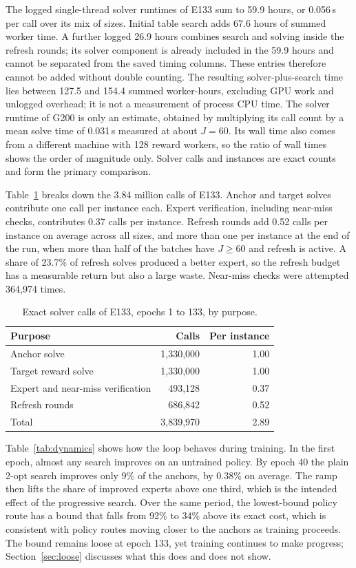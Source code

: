 \documentclass[preprint,12pt,authoryear]{elsarticle}
\begin{document}
The logged single-thread solver runtimes of E133 sum to 59.9 hours, or 0.056\,s per call over its mix of sizes. Initial table search adds 67.6 hours of summed worker time. A further logged 26.9 hours combines search and solving inside the refresh rounds; its solver component is already included in the 59.9 hours and cannot be separated from the saved timing columns. These entries therefore cannot be added without double counting. The resulting solver-plus-search time lies between 127.5 and 154.4 summed worker-hours, excluding GPU work and unlogged overhead; it is not a measurement of process CPU time. The solver runtime of G200 is only an estimate, obtained by multiplying its call count by a mean solve time of 0.031\,s measured at about $J = 60$. Its wall time also comes from a different machine with 128 reward workers, so the ratio of wall times shows the order of magnitude only. Solver calls and instances are exact counts and form the primary comparison.

Table~\ref{tab:calls} breaks down the 3.84 million calls of E133. Anchor and target solves contribute one call per instance each. Expert verification, including near-miss checks, contributes 0.37 calls per instance. Refresh rounds add 0.52 calls per instance on average across all sizes, and more than one per instance at the end of the run, when more than half of the batches have $J \ge 60$ and refresh is active. A share of 23.7\% of refresh solves produced a better expert, so the refresh budget has a measurable return but also a large waste. Near-miss checks were attempted 364,974 times.

\begin{table}[t]
\centering
\caption{Exact solver calls of E133, epochs 1 to 133, by purpose.}
\label{tab:calls}
\small
\begin{tabular}{lrr}
\toprule
Purpose & Calls & Per instance \\
\midrule
Anchor solve & 1,330,000 & 1.00 \\
Target reward solve & 1,330,000 & 1.00 \\
Expert and near-miss verification & 493,128 & 0.37 \\
Refresh rounds & 686,842 & 0.52 \\
Total & 3,839,970 & 2.89 \\
\bottomrule
\end{tabular}
\end{table}

Table~\ref{tab:dynamics} shows how the loop behaves during training. In the first epoch, almost any search improves on an untrained policy. By epoch 40 the plain 2-opt search improves only 9\% of the anchors, by 0.38\% on average. The ramp then lifts the share of improved experts above one third, which is the intended effect of the progressive search. Over the same period, the lowest-bound policy route has a bound that falls from 92\% to 34\% above its exact cost, which is consistent with policy routes moving closer to the anchors as training proceeds. The bound remains loose at epoch 133, yet training continues to make progress; Section~\ref{sec:loose} discusses what this does and does not show.
\end{document}
